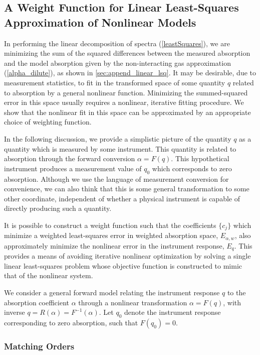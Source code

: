 \documentclass[12pt]{report}
\begin{document}
	\subsection{A Weight Function for Linear Least-Squares Approximation of Nonlinear Models}
	
	In performing the linear decomposition of spectra (\ref{leastSquares}), we are minimizing the sum of the squared differences between the measured absorption and the model absorption given by the non-interacting gas approximation (\ref{alpha_dilute}), as shown in \ref{sec:append_linear_lsq}. It may be desirable, due to measurement statistics, to fit in the transformed space of some quantity $q$ related to absorption by a general nonlinear function. Minimizing the summed-squared error in this space usually requires a nonlinear, iterative fitting procedure. We show that the nonlinear fit in this space can be approximated by an appropriate choice of weighting function.
	
	In the following discussion, we provide a simplistic picture of the quantity $q$ as a quantity which is measured by some instrument. This quantity is related to absorption through the forward conversion $\alpha = F(q)$. This hypothetical instrument produces a measurement value of $q_0$ which corresponds to zero absorption. Although we use the language of measurement conversion for convenience, we can also think that this is some general transformation to some other coordinate, independent of whether a physical instrument is capable of directly producing such a quantity.
	
	It is possible to construct a weight function such that the coefficients $\{c_j\}$ which minimize a weighted least-squares error in weighted absorption space, $E_{\alpha,w}$, also approximately minimize the nonlinear error in the instrument response, $E_q$. This provides a means of avoiding iterative nonlinear optimization by solving a single linear least-squares problem whose objective function is constructed to mimic that of the nonlinear system.
	
	We consider a general forward model relating the instrument response $q$ to the absorption coefficient $\alpha$ through a nonlinear transformation $\alpha = F(q)$, with inverse $q = R(\alpha) = F^{-1}(\alpha)$. Let $q_0$ denote the instrument response corresponding to zero absorption, such that $F(q_0)=0$.
	
	\subsubsection{Matching Orders}
	
\end{document}
